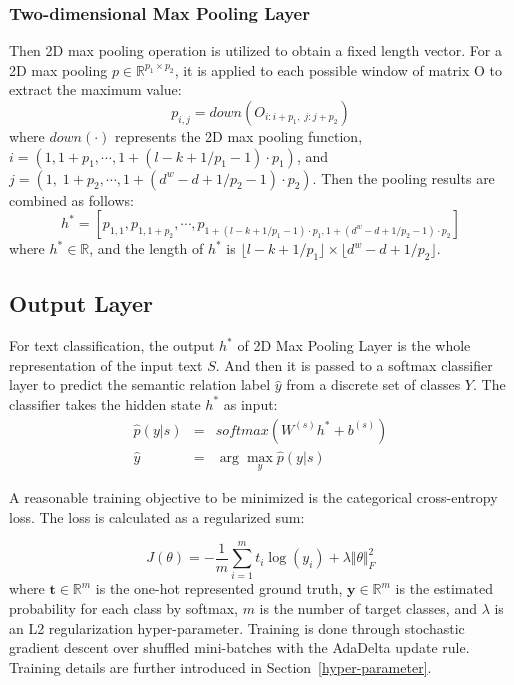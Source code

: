\documentclass[11pt]{article}
\begin{document}
\subsubsection{Two-dimensional Max Pooling Layer}


Then 2D max pooling operation is utilized to obtain a fixed length vector. For a 2D max pooling $p \in \mathbb{R}^{p_1 \times p_2}$, it is applied to each possible window of matrix O to extract the maximum value:
\begin{equation}
p_{i,j} = down{\left(O_{i:i+p_1, \; j:j+p_2}\right)}
\end{equation}
where $down(\cdot)$ represents the 2D max pooling function, $i= (1, 1+p_1,  \cdots,  1+(l-k+1/p_1-1) \cdot p_1)$,  and $j = (1, \; 1+p_2, \cdots, 1+(d^w-d+1/p_2-1) \cdot p_2)$.
Then the pooling results are combined as follows:
\begin{equation}
h^* = [p_{1, 1},  p_{1,  1+p_2}, \cdots, p_{1+(l-k+1/p_1-1) \cdot p_1, 1+(d^w-d+1/p_2-1) \cdot p_2}]
\end{equation}
where $h^* \in \mathbb{R}$, and the length of $h^*$ is $\lfloor l-k+1/p_1 \rfloor \times \lfloor d^w-d+1/p_2 \rfloor$.







\subsection{Output Layer}
For text classification, the output $h^*$ of 2D Max Pooling Layer is the whole representation of the input text $S$. And then it is passed to a softmax classifier layer to predict the semantic relation label $\hat{y}$ from a discrete set of classes $\mathit{Y}$. The classifier takes the hidden state $h^*$ as input:
\begin{eqnarray}
\hat{p}\left(y | s\right) & = & softmax \left(W^{\left(s\right)} h^* + b^{\left(s\right)}\right)\\
\hat{y} &  = & \arg \max_y \hat{p}\left(y | s\right)
\end{eqnarray}

A reasonable training objective to be minimized is the categorical cross-entropy loss.
The loss is calculated as a regularized sum:


\begin{equation}
J\left(\theta\right) = -\frac{1}{m}\sum_{i=1}^{m}t_i\log(y_i)  + \lambda{\Vert\theta\Vert}_F^2
\end{equation}
where $\boldsymbol{t} \in \mathbb{R}^m$ is the one-hot represented ground truth, $\boldsymbol{y} \in \mathbb{R}^m$ is the estimated probability for each class by softmax, $m$ is the number of target classes, and $\lambda$ is an L2 regularization hyper-parameter. Training is done through stochastic gradient descent over shuffled mini-batches with the AdaDelta \cite{zeiler2012adadelta} update rule. Training details are further introduced in Section~\ref{hyper-parameter}.
\end{document}
